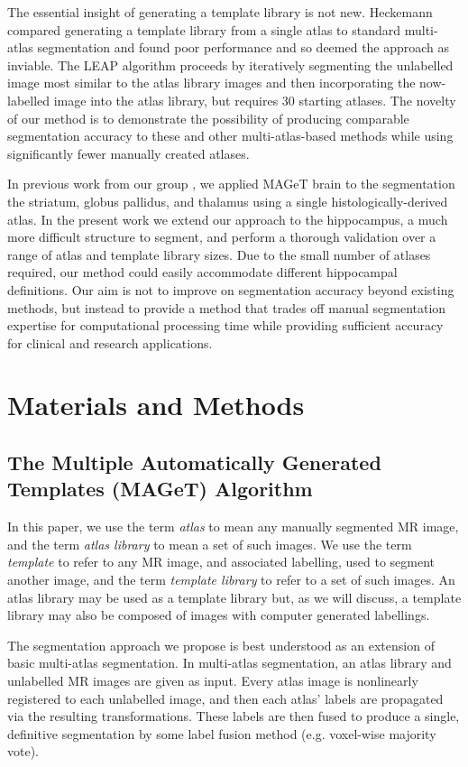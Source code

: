 \documentclass{article}\usepackage{graphicx, color}
\begin{document}
The essential insight of generating a template library is not new.  Heckemann
\cite{Heckemann2006} compared generating a template library from a single atlas
to standard multi-atlas segmentation and found poor performance and so deemed
the approach as inviable.  The LEAP algorithm \cite{Wolz2010} proceeds by
iteratively segmenting the unlabelled image most similar to the atlas library
images and then incorporating the now-labelled image into the atlas library,
but requires 30 starting atlases.  The novelty of our method is to demonstrate
the possibility of producing comparable segmentation accuracy to these and
other multi-atlas-based methods while using significantly fewer manually
created atlases.

In previous work from our group \cite{Chakravarty2012}, we applied MAGeT brain
to the segmentation the striatum, globus pallidus, and thalamus using a single
histologically-derived atlas. In the present work we extend our approach to the
hippocampus, a much more difficult structure to segment, and perform a thorough
validation over a range of atlas and template library sizes. Due to the small
number of atlases required, our method could easily accommodate different
hippocampal definitions. Our aim is not to improve on segmentation accuracy
beyond existing methods, but instead to provide a method that trades off manual
segmentation expertise for computational processing time while providing
sufficient accuracy for clinical and research applications.


\section{Materials and Methods} 
\subsection{The Multiple Automatically Generated Templates (MAGeT) Algorithm}

In this paper, we use the term {\it atlas} to mean any manually segmented MR
image, and the term {\it atlas library} to mean a set of such images.  We use
the term {\it template} to refer to any MR image, and associated labelling,
used to segment another image, and the term {\it template library} to refer to
a set of such images.  An atlas library may be used as a template library but,
as we will discuss, a template library may also be composed of images with
computer generated labellings. 

The segmentation approach we propose is best understood as an extension of
basic multi-atlas segmentation.  In multi-atlas segmentation, an atlas
library and unlabelled MR images are given as input.  Every atlas image is
nonlinearly registered to each unlabelled image, and then each atlas' labels
are propagated via the resulting transformations.  These labels are then fused
to produce a single, definitive segmentation by some label fusion method (e.g.
voxel-wise majority vote). 
\end{document}

